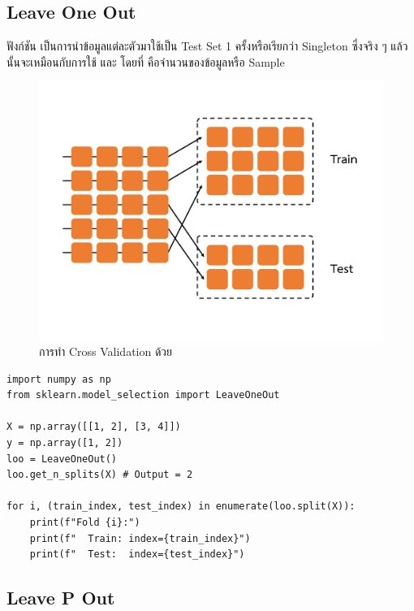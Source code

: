 \subsection{Leave One Out}
\label{ssec:leave_one_out}

ฟังก์ชัน  เป็นการนำข้อมูลแต่ละตัวมาใช้เป็น Test Set 1 ครั้งหรือเรียกว่า Singleton ซึ่งจริง ๆ แล้ว 
 นั้นจะเหมือนกับการใช้  และ  โดยที่ 
 คือจำนวนของข้อมูลหรือ Sample

\begin{figure}[H]
    \centering
    \includegraphics[width=0.9\linewidth,page=5]{fig/cross_validation.pdf}
    \caption{การทำ Cross Validation ด้วย }
    \label{fig:leave_one_out}
\end{figure}

\begin{lstlisting}[style=MyPython]
import numpy as np
from sklearn.model_selection import LeaveOneOut

X = np.array([[1, 2], [3, 4]])
y = np.array([1, 2])
loo = LeaveOneOut()
loo.get_n_splits(X) # Output = 2 

for i, (train_index, test_index) in enumerate(loo.split(X)):
    print(f"Fold {i}:")
    print(f"  Train: index={train_index}")
    print(f"  Test:  index={test_index}")
\end{lstlisting}

\subsection{Leave P Out}
\label{ssec:leave_p_out}

